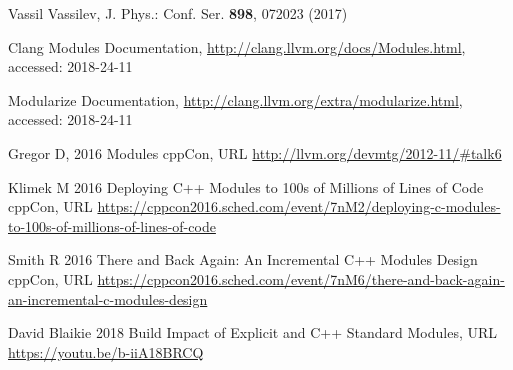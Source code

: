 \documentclass{webofc}
\begin{document}
\begin{thebibliography}{}

Vassil Vassilev, J. Phys.: Conf. Ser. \textbf{898}, 072023 (2017)

Clang Modules Documentation, \url{http://clang.llvm.org/docs/Modules.html}, accessed: 2018-24-11

Modularize Documentation, \url{http://clang.llvm.org/extra/modularize.html}, accessed: 2018-24-11

Gregor D,   2016 Modules cppCon, URL \url{http://llvm.org/devmtg/2012-11/#talk6}

Klimek M 2016 Deploying C++ Modules to 100s of Millions of Lines of Code cppCon, URL \url{https://cppcon2016.sched.com/event/7nM2/deploying-c-modules-to-100s-of-millions-of-lines-of-code}

Smith R 2016 There and Back Again: An Incremental C++ Modules Design cppCon, URL \url{https://cppcon2016.sched.com/event/7nM6/there-and-back-again-an-incremental-c-modules-design}


David Blaikie 2018 Build Impact of Explicit and C++ Standard Modules, URL \url{https://youtu.be/b-iiA18BRCQ}



\end{thebibliography}
\end{document}

